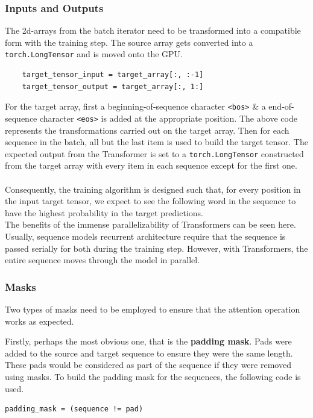 \documentclass[12pt,a4paper,twoside,openright]{report}
\begin{document}
\subsubsection{Inputs and Outputs}
The 2d-arrays from the batch iterator need to be transformed into a compatible form with the training step. The source array gets converted into a \lstinline{torch.LongTensor} and is moved onto the GPU.

\begin{lstlisting}
    target_tensor_input = target_array[:, :-1]
    target_tensor_output = target_array[:, 1:]
\end{lstlisting}

 For the target array, first a beginning-of-sequence character \lstinline{<bos>} \& a end-of-sequence character \lstinline{<eos>} is added at the appropriate position. The above code represents the transformations carried out on the target array.
Then for each sequence in the batch, all but the last item is used to build the target tensor.
The expected output from the Transformer is set to a \lstinline{torch.LongTensor} constructed from the target array with every item in each sequence except for the first one.
\\\\
Consequently, the training algorithm is designed such that, for every position in the input target tensor, we expect to see the following word in the sequence to have the highest probability in the target predictions. \\
The benefits of the immense parallelizability of Transformers can be seen here. Usually, sequence models recurrent architecture require that the sequence is passed serially for both during the training step. However, with Transformers, the entire sequence moves through the model in parallel.

\subsubsection{Masks}
Two types of masks need to be employed to ensure that the attention operation works as expected.

Firstly, perhaps the most obvious one, that is the \textbf{padding mask}. Pads were added to the source and target sequence to ensure they were the same length. These pads would be considered as part of the sequence if they were removed using masks. To build the padding mask for the sequences, the following code is used.
\begin{lstlisting}[label=padding-code]
    padding_mask = (sequence != pad)
\end{lstlisting}
\end{document}
